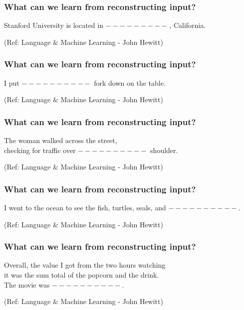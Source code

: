 \begin{frame}[fragile]\frametitle{What can we learn from reconstructing input?}

\begin{center}
Stanford University is located in $---------$	, California.
\end{center}		  

{\tiny (Ref: Language \& Machine Learning - John Hewitt)}
\end{frame}

\begin{frame}[fragile]\frametitle{What can we learn from reconstructing input?}

\begin{center}
I put $----------$ fork down on the table.
\end{center}		  

{\tiny (Ref: Language \& Machine Learning - John Hewitt)}
\end{frame}

\begin{frame}[fragile]\frametitle{What can we learn from reconstructing input?}

\begin{center}
The woman walked across the street, \\ checking for traffic over $----------$ shoulder.
\end{center}		  

{\tiny (Ref: Language \& Machine Learning - John Hewitt)}
\end{frame}

\begin{frame}[fragile]\frametitle{What can we learn from reconstructing input?}

\begin{center}
I went to the ocean to see the fish, turtles, seals, and $----------$.
\end{center}		  

{\tiny (Ref: Language \& Machine Learning - John Hewitt)}
\end{frame}

\begin{frame}[fragile]\frametitle{What can we learn from reconstructing input?}

\begin{center}
Overall, the value I got from the two hours watching \\ it was the sum total of the popcorn and the drink.\\
The movie was  $----------$.
\end{center}		  

{\tiny (Ref: Language \& Machine Learning - John Hewitt)}
\end{frame}

